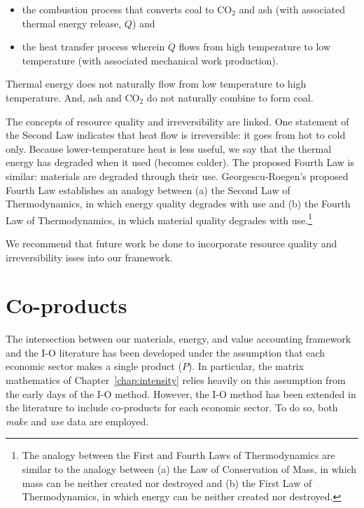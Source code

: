 \begin{itemize}
	\item{the combustion process that converts coal to CO$_{2}$ and ash 
	(with associated thermal energy release, $\dot{Q}$) and}
	\item{the heat transfer process wherein $\dot{Q}$ flows 
	from high temperature to low temperature (with associated mechanical work production).}
\end{itemize}

\noindent{}Thermal energy does not naturally flow from low temperature to high temperature.
And, ash and CO$_{2}$ do not naturally combine to form coal.

The concepts of resource quality and irreversibility are linked.
One statement of the Second Law indicates that heat flow is irreversible: 
it goes from hot to cold only. 
Because lower-temperature heat is less useful, 
we say that the thermal energy has degraded when it used (becomes colder).
The proposed Fourth Law is similar: 
materials are degraded through their use.
Georgescu-Roegen's proposed Fourth Law establishes an analogy between
(a) the Second Law of Thermodynamics, 
in which energy quality degrades with use and
(b) the Fourth Law of Thermodynamics,
in which material quality degrades with use.\footnote{The analogy 
	between the First and Fourth Laws of Thermodynamics
	are similar to the analogy between 
		(a) the Law of Conservation of Mass, 
		in which mass can be neither created nor destroyed and 
		(b) the First Law of Thermodynamics, 
		in which energy can be neither created nor destroyed.}

We recommend that future work be done to incorporate 
resource quality and irreversibility isses 
into our framework.


\section{Co-products}
\label{sec:make-use}

The intersection between our materials, energy, and value accounting framework 
and the I-O literature has been developed under the assumption 
that each economic sector makes a single product ($\dot{P}$).
In particular, the matrix mathematics of Chapter~\ref{chap:intensity}
relies heavily on this assumption 
from the early days of the I-O method.\cite{Bullard:1978vd}
However, the I-O method has been extended 
in the literature to include
co-products for each economic sector.\cite{Costanza:1984tq,Casler1984} 
To do so, both \emph{make} and \emph{use} data are employed.

